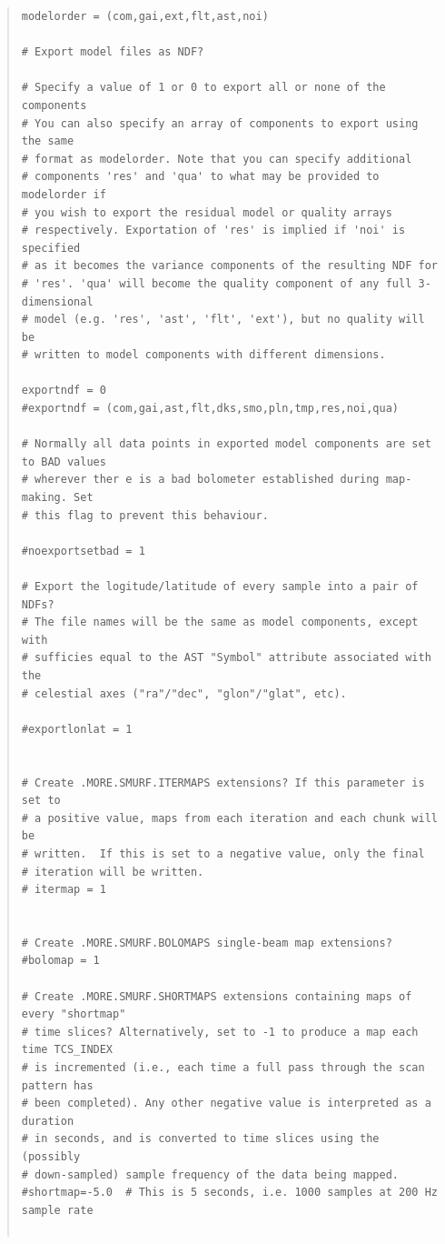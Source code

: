 \documentclass[twoside,11pt]{article}
\renewcommand{\_}{\texttt{\symbol{95}}}
\newenvironment{myquote}{\begin{quote}\begin{small}}{\end{small}\end{quote}}
\begin{document}
\begin{myquote}
\begin{verbatim}
modelorder = (com,gai,ext,flt,ast,noi)

# Export model files as NDF?

# Specify a value of 1 or 0 to export all or none of the components
# You can also specify an array of components to export using the same
# format as modelorder. Note that you can specify additional
# components 'res' and 'qua' to what may be provided to modelorder if
# you wish to export the residual model or quality arrays
# respectively. Exportation of 'res' is implied if 'noi' is specified
# as it becomes the variance components of the resulting NDF for
# 'res'. 'qua' will become the quality component of any full 3-dimensional
# model (e.g. 'res', 'ast', 'flt', 'ext'), but no quality will be
# written to model components with different dimensions.

exportndf = 0
#exportndf = (com,gai,ast,flt,dks,smo,pln,tmp,res,noi,qua)

# Normally all data points in exported model components are set to BAD values
# wherever ther e is a bad bolometer established during map-making. Set
# this flag to prevent this behaviour.

#noexportsetbad = 1

# Export the logitude/latitude of every sample into a pair of NDFs?
# The file names will be the same as model components, except with
# sufficies equal to the AST "Symbol" attribute associated with the
# celestial axes ("ra"/"dec", "glon"/"glat", etc).

#exportlonlat = 1


# Create .MORE.SMURF.ITERMAPS extensions? If this parameter is set to
# a positive value, maps from each iteration and each chunk will be
# written.  If this is set to a negative value, only the final
# iteration will be written.
# itermap = 1


# Create .MORE.SMURF.BOLOMAPS single-beam map extensions?
#bolomap = 1

# Create .MORE.SMURF.SHORTMAPS extensions containing maps of every "shortmap"
# time slices? Alternatively, set to -1 to produce a map each time TCS_INDEX
# is incremented (i.e., each time a full pass through the scan pattern has
# been completed). Any other negative value is interpreted as a duration
# in seconds, and is converted to time slices using the (possibly
# down-sampled) sample frequency of the data being mapped.
#shortmap=-5.0  # This is 5 seconds, i.e. 1000 samples at 200 Hz sample rate


\end{verbatim}
\end{myquote}
\end{document}
